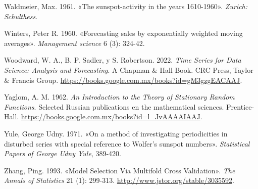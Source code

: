\documentclass[
  us-letterpaper,
]{scrreprt}
\newlength{\cslhangindent}
\newenvironment{CSLReferences}[2] %
 {\begin{list}{}{%
  \setlength{\itemindent}{0pt}
  \setlength{\leftmargin}{0pt}
  \setlength{\parsep}{0pt}
  \ifodd #1
   \setlength{\leftmargin}{\cslhangindent}
   \setlength{\itemindent}{-1\cslhangindent}
  \fi
  \setlength{\itemsep}{#2\baselineskip}}}
 {\end{list}}
\theoremstyle{definition}
\theoremstyle{plain}
\theoremstyle{plain}
\theoremstyle{definition}
\theoremstyle{remark}
\begin{document}
\begin{CSLReferences}{1}{0}
Waldmeier, Max. 1961. {«The sunspot-activity in the years 1610-1960»}.
\emph{Zurich: Schulthess}.

Winters, Peter R. 1960. {«Forecasting sales by exponentially weighted
moving averages»}. \emph{Management science} 6 (3): 324-42.

Woodward, W. A., B. P. Sadler, y S. Robertson. 2022. \emph{Time Series
for Data Science: Analysis and Forecasting}. A Chapman \& Hall Book. CRC
Press, Taylor \& Francis Group.
\url{https://books.google.com.mx/books?id=gM3gzgEACAAJ}.

Yaglom, A. M. 1962. \emph{An Introduction to the Theory of Stationary
Random Functions}. Selected Russian publications en the mathematical
sciences. Prentice-Hall.
\url{https://books.google.com.mx/books?id=l_JvAAAAIAAJ}.

Yule, George Udny. 1971. {«On a method of investigating periodicities in
disturbed series with special reference to Wolfer's sunspot numbers»}.
\emph{Statistical Papers of George Udny Yule}, 389-420.

Zhang, Ping. 1993. {«Model Selection Via Multifold Cross Validation»}.
\emph{The Annals of Statistics} 21 (1): 299-313.
\url{http://www.jstor.org/stable/3035592}.

\end{CSLReferences}
\end{document}
